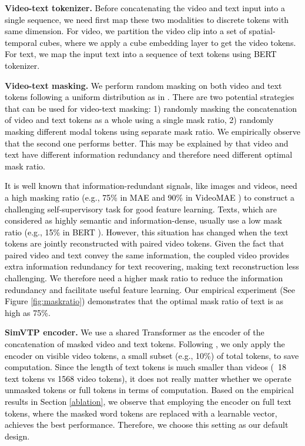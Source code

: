 \documentclass[10pt,twocolumn,letterpaper]{article}
\newcommand{\yty}[1]{\textcolor{black}{#1}}
\begin{document}
\noindent\textbf{Video-text tokenizer.}
\yty{Before concatenating the video and text input into a single sequence, we need first map these two modalities to discrete tokens with same dimension. For video, we partition the video clip into a set of spatial-temporal cubes, where we apply a cube embedding layer \cite{arnab2021vivit, fan2021multiscale, tong2022videomae} to get the video tokens. For text, we map the input text into a sequence of text tokens using BERT\cite{devlin2018bert} tokenizer. }

\noindent\textbf{Video-text masking.}
\yty{We perform random masking on both video and text tokens following a uniform distribution as in \cite{tong2022videomae, devlin2018bert}. }
\yty{There are two potential strategies that can be used for video-text masking: 1) randomly masking the concatenation of video and text tokens as a whole using a single mask ratio, 2) randomly masking different modal tokens using separate mask ratio. We empirically observe that the second one performs better. This may be explained by that video and text have different information redundancy and therefore need different optimal mask ratio.}

\yty{It is well known that information-redundant signals, like images and videos, need a high masking ratio (e.g., 75\% in MAE \cite{he2022masked} and 90\% in VideoMAE \cite{tong2022videomae}) to construct a challenging self-supervisory task for good feature learning. Texts, which are  considered as highly semantic and information-dense,  usually use a low mask ratio (e.g., 15\% in BERT \cite{devlin2018bert}). However, this situation has changed when the text tokens are jointly reconstructed with paired video tokens. Given the fact that paired video and text convey the same information, the coupled video provides extra information redundancy for text recovering, making text reconstruction less challenging. We therefore need a higher mask ratio to reduce the information redundancy and facilitate useful feature learning. Our empirical experiment (See Figure \ref{fig:maskratio}) demonstrates that the optimal mask ratio of text is as high as 75\%. }




\noindent\textbf{SimVTP encoder.}
\yty{We use a shared Transformer \cite{attention-all-you-need} as the encoder of the concatenation of masked video and text tokens. Following \cite{tong2022videomae, he2022masked}, we only apply the encoder on visible video tokens, a small subset (e.g., 10\%) of total tokens, to save computation.  Since the length of text tokens is much smaller than videos (~18 text tokens vs 1568 video tokens), it does not really matter whether we operate unmasked tokens or full tokens in terms of computation.  Based on the empirical results in Section \ref{ablation}, we observe that employing the encoder on full text tokens, where the masked word tokens are replaced with a learnable vector, achieves the best performance. Therefore, we choose this setting as our default design. }
\end{document}

